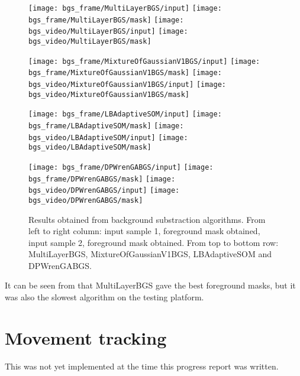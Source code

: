\begin{figure}[H]
  \centering
  \texttt{[image: bgs\_frame/MultiLayerBGS/input]}
  \texttt{[image: bgs\_frame/MultiLayerBGS/mask]}
  \texttt{[image: bgs\_video/MultiLayerBGS/input]}
  \texttt{[image: bgs\_video/MultiLayerBGS/mask]}

  \texttt{[image: bgs\_frame/MixtureOfGaussianV1BGS/input]}
  \texttt{[image: bgs\_frame/MixtureOfGaussianV1BGS/mask]}
  \texttt{[image: bgs\_video/MixtureOfGaussianV1BGS/input]}
  \texttt{[image: bgs\_video/MixtureOfGaussianV1BGS/mask]}

  \texttt{[image: bgs\_frame/LBAdaptiveSOM/input]}
  \texttt{[image: bgs\_frame/LBAdaptiveSOM/mask]}
  \texttt{[image: bgs\_video/LBAdaptiveSOM/input]}
  \texttt{[image: bgs\_video/LBAdaptiveSOM/mask]}

  \texttt{[image: bgs\_frame/DPWrenGABGS/input]}
  \texttt{[image: bgs\_frame/DPWrenGABGS/mask]}
  \texttt{[image: bgs\_video/DPWrenGABGS/input]}
  \texttt{[image: bgs\_video/DPWrenGABGS/mask]}
  \caption{Results obtained from background substraction algorithms. From left to right column: input sample 1, foreground mask obtained, input sample 2, foreground mask obtained. From top to bottom row: MultiLayerBGS, MixtureOfGaussianV1BGS, LBAdaptiveSOM and DPWrenGABGS.}
  \label{Figure:bgs_frame}
\end{figure}

It can be seen from  that MultiLayerBGS gave the best foreground masks, but it was also the slowest algorithm on the testing platform.

\section{Movement tracking}
\label{impl:tracking}

This was not yet implemented at the time this progress report was written.
